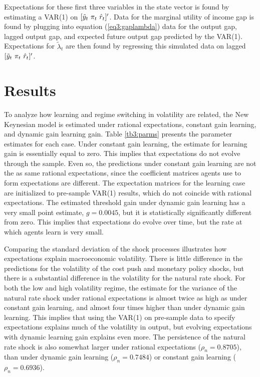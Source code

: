 Expectations for these first three variables in the state vector is found by estimating a VAR(1) on $[\tilde{y}_t~ \pi_t~ \hat{r}_t]'$.  Data for the marginal utility of income gap is found by plugging into equation (\ref{eq3:gaplambda}) data for the output gap, lagged output gap, and expected future output gap predicted by the VAR(1).  Expectations for $\tilde{\lambda}_t$ are then found by regressing this simulated data on lagged $[\tilde{y}_t~ \pi_t~ \hat{r}_t]'$.

\section{Results}
To analyze how learning and regime switching in volatility are related, the New Keynesian model is estimated under rational expectations, constant gain learning, and dynamic gain learning gain.  Table \ref{tb3:parms} presents the parameter estimates for each case.  Under constant gain learning, the estimate for learning gain is essentially equal to zero.  This implies that expectations do not evolve through the sample.  Even so, the predictions under constant gain learning are not the as same rational expectations, since the coefficient matrices agents use to form expectations are different.  The expectation matrices for the learning case are initialized to pre-sample VAR(1) results, which do not coincide with rational expectations.  The estimated threshold gain under dynamic gain learning has a very small point estimate, $g=0.0045$, but it is statistically significantly different from zero.  This implies that expectations do evolve over time, but the rate at which agents learn is very small.  

Comparing the standard deviation of the shock processes illustrates how expectations explain macroeconomic volatility.  There is little difference in the predictions for the volatility of the cost push and monetary policy shocks, but there is a substantial difference in the volatility for the natural rate shock.  For both the low and high volatility regime, the estimate for the variance of the natural rate shock under rational expectations is almost twice as high as under constant gain learning, and almost four times higher than under dynamic gain learning.  This implies that using the VAR(1) on pre-sample data to specify expectations explains much of the volatility in output, but evolving expectations with dynamic learning gain explains even more.  The persistence of the natural rate shock is also somewhat larger under rational expectations ($\rho_n=0.8705$), than under dynamic gain learning ($\rho_n=0.7484$) or constant gain learning ($\rho_n=0.6936$).  

